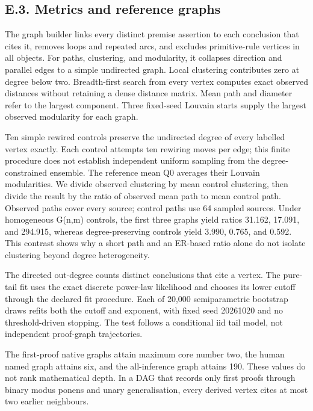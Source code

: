 \documentclass[pdflatex,sn-basic,Numbered]{sn-jnl}
\begin{document}
\subsection*{E.3. Metrics and reference graphs}\label{e.3.-metrics-and-reference-graphs}

The graph builder links every distinct premise assertion to each conclusion that cites it, removes loops and repeated arcs, and excludes primitive-rule vertices in all objects. For paths, clustering, and modularity, it collapses direction and parallel edges to a simple undirected graph. Local clustering contributes zero at degree below two. Breadth-first search from every vertex computes exact observed distances without retaining a dense distance matrix. Mean path and diameter refer to the largest component. Three fixed-seed Louvain starts supply the largest observed modularity for each graph.

Ten simple rewired controls preserve the undirected degree of every labelled vertex exactly. Each control attempts ten rewiring moves per edge; this finite procedure does not establish independent uniform sampling from the degree-constrained ensemble. The reference mean Q0 averages their Louvain modularities. We divide observed clustering by mean control clustering, then divide the result by the ratio of observed mean path to mean control path. Observed paths cover every source; control paths use 64 sampled sources. Under homogeneous G(n,m) controls, the first three graphs yield ratios 31.162, 17.091, and 294.915, whereas degree-preserving controls yield 3.990, 0.765, and 0.592. This contrast shows why a short path and an ER-based ratio alone do not isolate clustering beyond degree heterogeneity.

The directed out-degree counts distinct conclusions that cite a vertex. The pure-tail fit uses the exact discrete power-law likelihood and chooses its lower cutoff through the declared fit procedure. Each of 20,000 semiparametric bootstrap draws refits both the cutoff and exponent, with fixed seed 20261020 and no threshold-driven stopping. The test follows a conditional iid tail model, not independent proof-graph trajectories. 

The first-proof native graphs attain maximum core number two, the human named graph attains six, and the all-inference graph attains 190. These values do not rank mathematical depth. In a DAG that records only first proofs through binary modus ponens and unary generalisation, every derived vertex cites at most two earlier neighbours.
\end{document}
